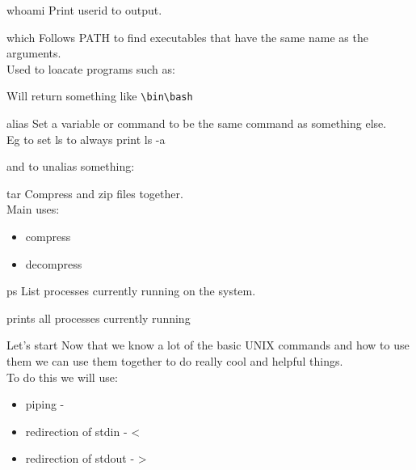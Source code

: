 \documentclass{beamer}
\begin{document}
\begin{frame}{whoami}
    Print userid to output.
\end{frame}

\begin{frame}{which}
Follows PATH to find executables that have the same name as the arguments.\\Used to loacate programs such as:
\begin{center}
\end{center}
Will return something like \texttt{\textbackslash bin\textbackslash bash}
\end{frame}

\begin{frame}{alias}
Set a variable or command to be the same command as something else.\\Eg to set ls to always print ls -a
\begin{center}
\end{center}
and to unalias something:
\begin{center}
\end{center}
\end{frame}

\begin{frame}{tar}
Compress and zip files together.\\ Main uses:
\begin{itemize}
    \item compress\\
    \item decompress\\
\end{itemize}
\end{frame}

\begin{frame}{ps}
List processes currently running on the system.
\begin{center}
     prints all processes currently running
\end{center}
\end{frame}

\begin{frame}{Let's start}
    Now that we know a lot of the basic UNIX commands and how to use them we can use them together to do really cool and helpful things.\\To do this we will use:
    \begin{itemize}
        \item piping - \textbar
        \item redirection of stdin - \textless
        \item redirection of stdout - \textgreater
    \end{itemize}
\end{frame}
\end{document}
